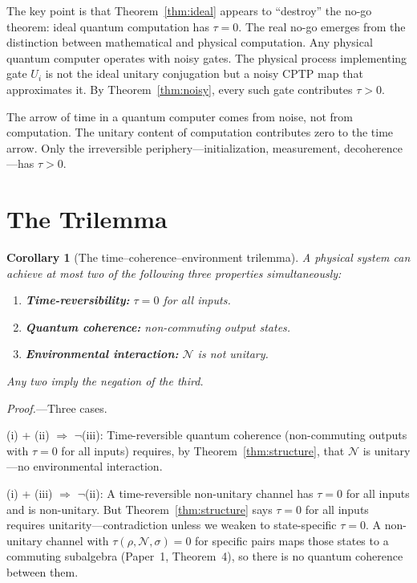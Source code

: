 \documentclass[prl,twocolumn,superscriptaddress,longbibliography,floatfix]{revtex4-2}
\newtheorem{corollary}[theorem]{Corollary}
\newcommand{\chan}{\mathcal{N}}
\newcommand{\tauasym}{\tau}
\begin{document}
The key point is that Theorem~\ref{thm:ideal} appears to ``destroy''
the no-go theorem: ideal quantum computation has $\tauasym = 0$.
The real no-go emerges from the distinction between mathematical
and physical computation.  Any physical quantum computer operates
with noisy gates.  The physical process implementing gate $U_i$ is
not the ideal unitary conjugation but a noisy CPTP map that
approximates it.  By Theorem~\ref{thm:noisy}, every such gate
contributes $\tauasym > 0$.

The arrow of time in a quantum computer comes from noise, not from
computation.  The unitary content of computation contributes zero
to the time arrow.  Only the irreversible periphery---initialization,
measurement, decoherence---has $\tauasym > 0$.

\section{The Trilemma}
\label{sec:trilemma}

\begin{corollary}[The time--coherence--environment trilemma]
\label{cor:trilemma}
A physical system can achieve at most two of the following three
properties simultaneously:
\begin{enumerate}
\item[\emph{(i)}] \textbf{Time-reversibility:}
  $\tauasym = 0$ for all inputs.
\item[\emph{(ii)}] \textbf{Quantum coherence:}
  non-commuting output states.
\item[\emph{(iii)}] \textbf{Environmental interaction:}
  $\chan$ is not unitary.
\end{enumerate}
Any two imply the negation of the third.
\end{corollary}

\emph{Proof.}---Three cases.

(i) + (ii) $\Rightarrow$ $\lnot$(iii):
Time-reversible quantum coherence (non-commuting outputs with
$\tauasym = 0$ for all inputs) requires, by
Theorem~\ref{thm:structure}, that $\chan$ is unitary---no
environmental interaction.

(i) + (iii) $\Rightarrow$ $\lnot$(ii):
A time-reversible non-unitary channel has
$\tauasym = 0$ for all inputs and is non-unitary.  But
Theorem~\ref{thm:structure} says $\tauasym = 0$ for all inputs
requires unitarity---contradiction unless we weaken to
state-specific $\tauasym = 0$.  A non-unitary channel with
$\tauasym(\rho, \chan, \sigma) = 0$ for specific pairs maps those
states to a commuting subalgebra (Paper~1, Theorem~4), so there is
no quantum coherence between them.
\end{document}
